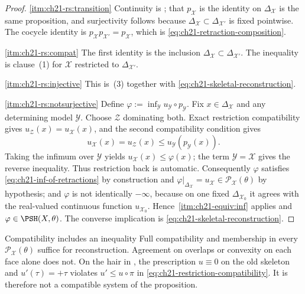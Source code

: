 \begin{proof}
\cref{itm:ch21-rs:transition}  Continuity is
; that $p_{\mathcal X}$ is the identity on
$\Delta_{\mathcal X}$ is the same proposition, and surjectivity follows
because $\Delta_{\mathcal X}\subset\Delta_{\mathcal X'}$ is fixed
pointwise.  The cocycle identity is
$p_{\mathcal X}p_{\mathcal X'}=p_{\mathcal X}$, which is
\eqref{eq:ch21-retraction-composition}.

\cref{itm:ch21-rs:compat}  The first identity is the inclusion
$\Delta_{\mathcal X}\subset\Delta_{\mathcal X'}$.  The inequality is
clause~(1) for $\mathcal X$ restricted to $\Delta_{\mathcal X'}$.

\cref{itm:ch21-rs:injective}  This is
\,(3) together with
\eqref{eq:ch21-skeletal-reconstruction}.

\cref{itm:ch21-rs:notsurjective}  Define
$\varphi:=\inf_{\mathcal Y}u_{\mathcal Y}\circ p_{\mathcal Y}$.
Fix $x\in\Delta_{\mathcal X}$ and any determining model $\mathcal Y$.
Choose $\mathcal Z$ dominating both.  Exact restriction compatibility gives
$u_{\mathcal Z}(x)=u_{\mathcal X}(x)$, and the second compatibility
condition gives
\[
 u_{\mathcal X}(x)=u_{\mathcal Z}(x)
 \leq u_{\mathcal Y}(p_{\mathcal Y}(x)).
\]
Taking the infimum over $\mathcal Y$ yields
$u_{\mathcal X}(x)\leq\varphi(x)$; the term $\mathcal Y=\mathcal X$
gives the reverse inequality.  Thus restriction back is automatic.
Consequently $\varphi$ satisfies \eqref{eq:ch21-inf-of-retractions} by construction and
$\varphi|_{\Delta_{\mathcal X}}=u_{\mathcal X}\in
\mathcal P_{\mathcal X}(\theta)$ by hypothesis; and $\varphi$ is not
identically $-\infty$, because on one fixed $\Delta_{\mathcal X_0}$ it
agrees with the real-valued continuous function $u_{\mathcal X_0}$.
Hence \,\cref{itm:ch21-equiv:inf} applies and
$\varphi\in\PSH(X,\theta)$.  The converse implication is
\eqref{eq:ch21-skeletal-reconstruction}.
\end{proof}

\begin{warning}{Compatibility includes an inequality}
Full compatibility and membership in every
$\mathcal P_{\mathcal X}(\theta)$ suffice for reconstruction.
Agreement on overlaps or convexity on each face alone does not.
On the hair in , the prescription
$u\equiv0$ on the old skeleton and $u'(\tau)=+\tau$ violates
$u'\leq u\circ\pi$ in \eqref{eq:ch21-restriction-compatibility}.
It is therefore not a compatible system of the proposition.
\end{warning}


